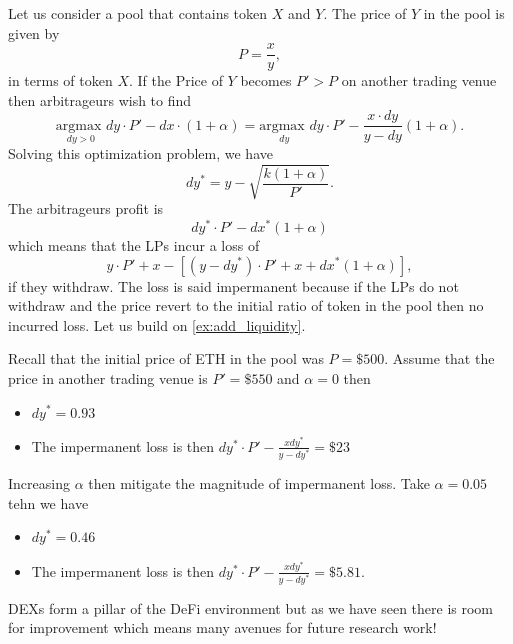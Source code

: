 Let us consider a pool that contains token $X$ and $Y$. The price of $Y$ in the pool is given by 
$$
P = \frac{x}{y},
$$
in terms of token $X$. If the Price of $Y$ becomes $P'>P$ on another trading venue then arbitrageurs wish to find
  $$
  \underset{dy > 0}{\text{argmax }}dy\cdot P' - dx\cdot (1+\alpha) =\underset{dy}{\text{argmax }}dy\cdot P' - \frac{x\cdot dy}{y-dy}(1+\alpha). 
  $$
  Solving this optimization problem, we have 
  $$
  dy^\ast = y - \sqrt{\frac{k(1+\alpha)}{P'}}.
  $$
  The arbitrageurs profit is 
  $$
  dy^\ast\cdot P' -  dx^\ast (1+\alpha)
  $$
  which means that the LPs incur a loss of
  $$
  y\cdot P' + x - [(y-dy^\ast)\cdot P' + x + dx^\ast(1+\alpha)],
  $$
  if they withdraw. The loss is said impermanent because if the LPs do not withdraw and the price revert to the initial ratio of token in the pool then no incurred loss. Let us build on \cref{ex:add_liquidity}.
  \begin{ex}\label{ex:impermanent_loss}
  Recall that the initial price of ETH in the pool was $P = \$500$. Assume that the price in another trading venue is $P' = \$550$ and $\alpha = 0$ then 
    \begin{itemize}
      \item $dy^\ast = 0.93$
      \item The impermanent loss is then $dy^\ast\cdot P' -\frac{xdy^\ast}{y - dy^\ast} = \$23$
    \end{itemize}
    Increasing $\alpha$ then mitigate the magnitude of impermanent loss. Take $\alpha = 0.05$ tehn we have
        \begin{itemize}
      \item $dy^\ast = 0.46$
      \item The impermanent loss is then $dy^\ast\cdot P' -\frac{xdy^\ast}{y - dy^\ast} = \$5.81$.
    \end{itemize}

  \end{ex}
DEXs form a pillar of the DeFi environment but as we have seen there is room for improvement which means many avenues for future research work!












